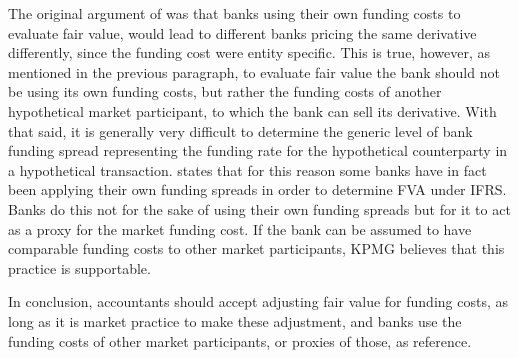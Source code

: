 \documentclass[./sub-main.tex]{subfiles}
\begin{document}
            The original argument of \cite{HullWhiteFVA} was that banks using their own funding costs to evaluate fair value,
            would lead to different banks pricing the same derivative differently,
            since the funding cost were entity specific.
            This is true, however, as mentioned in the previous paragraph,
            to evaluate fair value the bank should not be using its own funding costs, 
            but rather the funding costs of another hypothetical market participant, 
            to which the bank can sell its derivative.
            With that said, it is generally very difficult to determine the generic level of bank funding spread
            representing the funding rate for the hypothetical counterparty in a hypothetical transaction.
            \cite[Proposition 4]{KPMGFVA} states that for this reason 
            some banks have in fact been applying their own funding spreads in order to determine FVA under IFRS. 
            Banks do this not for the sake of using their own funding spreads
            but for it to act as a proxy for the market funding cost.
            If the bank can be assumed to have comparable funding costs to other market participants,
            KPMG believes that this practice is supportable.

            In conclusion, accountants should accept adjusting fair value for funding costs,
            as long as it is market practice to make these adjustment,
            and banks use the funding costs of other market participants, or proxies of those, as reference.
\end{document}
